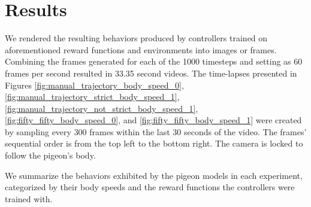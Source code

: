 \chapter{Results}

  We rendered the resulting behaviors produced by controllers trained on aforementioned reward functions and environments into images or frames.
  Combining the frames generated for each of the 1000 timesteps and setting as 60 frames per second resulted in 33.35 second videos.
  The time-lapses presented in Figures \ref{fig:manual_trajectory_body_speed_0}, \ref{fig:manual_trajectory_strict_body_speed_1}, \ref{fig:manual_trajectory_not_strict_body_speed_1}, \ref{fig:fifty_fifty_body_speed_0}, and \ref{fig:fifty_fifty_body_speed_1} were created by sampling every $300$ frames within the last 30 seconds of the video.
  The frames' sequential order is from the top left to the bottom right.
  The camera is locked to follow the pigeon's body.

  We summarize the behaviors exhibited by the pigeon models in each experiment, categorized by their body speeds and the reward functions the controllers were trained with.

